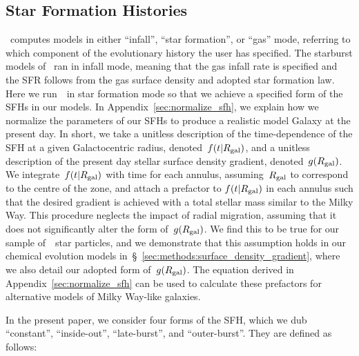 \documentclass[draft2.tex]{subfiles}
\begin{document}
\subsection{Star Formation Histories} 
\label{sec:methods:sfhs} 
\vice~computes models in either ``infall'', ``star formation'', or ``gas'' 
mode, referring to which component of the evolutionary history the user has 
specified. 
The starburst models of~\citet{Johnson2020} ran in infall mode, 
meaning that the gas infall rate is specified and the SFR follows from the gas 
surface density and adopted star formation law. 
Here we run~\vice~in star formation mode so that we achieve a specified form of 
the SFHs in our models. 
In Appendix~\ref{sec:normalize_sfh}, we explain how we normalize the parameters 
of our SFHs to produce a realistic model Galaxy at the present day. 
In short, we take a unitless description of the time-dependence of the SFH at a 
given Galactocentric radius, denoted~$f(t|R_\text{gal})$, and a unitless description 
of the present day stellar surface density gradient, denoted~$g(R_\text{gal})$. 
We integrate~$f(t|R_\text{gal})$ with time for each annulus, assuming~$R_\text{gal}$ to 
correspond to the centre of the zone, and attach a prefactor to 
$f(t|R_\text{gal})$ in each annulus such that the desired gradient is achieved 
with a total stellar mass similar to the Milky Way. 
This procedure neglects the impact of radial migration, assuming that it does 
not significantly alter the form of~$g(R_\text{gal})$. 
{\color{red} 
We find this to be true for our sample of~\hsim~star particles, and we 
demonstrate that this assumption holds in our chemical evolution models 
in~\S~\ref{sec:methods:surface_density_gradient}, where we also detail our 
adopted form of~$g(R_\text{gal})$. 
}
The equation derived in Appendix~\ref{sec:normalize_sfh} can be used to 
calculate these prefactors for alternative models of Milky Way-like galaxies. 
\par 
In the present paper, we consider four forms of the SFH, which we dub 
``constant'', ``inside-out'', ``late-burst'', and ``outer-burst''. 
They are defined as follows: 
\end{document}
